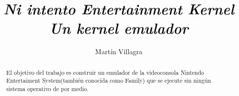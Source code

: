 \documentclass[a4paper,12pt,spanish,notitlepage]{report}
\def\name{\textsl{Ni intento Entertainment Kernel}}
\begin{document}
\title{\name\\\large\textit{Un kernel emulador}}
\author{Martín Villagra}
\maketitle
\vspace{1cm}
\vspace{\fill}
\begin{abstract}\centering
El objetivo del trabajo es construir un emulador de la videoconsola Nintendo Entertaiment System(también conocida como Family) que se ejecute sin ningún sistema operativo de por medio.
\end{abstract}
\raggedright
\tableofcontents


\end{document}

